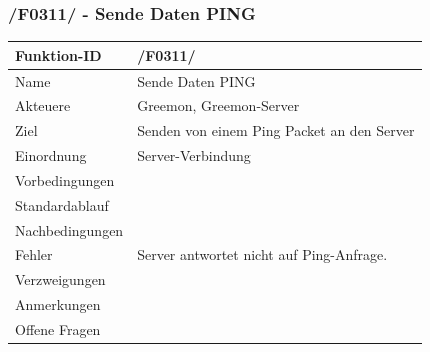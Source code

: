 \documentclass[pointlessnumbers]{scrartcl}
\begin{document}
 \subsubsection{/F0311/ - Sende Daten PING}
 \begin{tabular}{|p{\BreiteErsterTab}|p{\BreiteZweiterTab}|}\hline
   Funktion-ID          & /F0311/  
                        \\ \hline
   Name                 & Sende Daten PING
                        \\ \hline
   Akteuere             & Greemon, Greemon-Server
                        \\ \hline
   Ziel                 & Senden von einem Ping Packet an den Server 
                        \\ \hline
    Einordnung          &  Server-Verbindung 
                        \\ \hline
    Vorbedingungen      &   
                        \\ \hline
    Standardablauf      &  
                        \\ \hline
    Nachbedingungen     &   
                        \\ \hline
    Fehler              & Server antwortet nicht auf Ping-Anfrage. 
                        \\ \hline
    Verzweigungen       &   
                        \\ \hline
    Anmerkungen         &   
                        \\ \hline
    Offene Fragen       &   
                        \\ \hline
 \end{tabular} 
 
\end{document}
